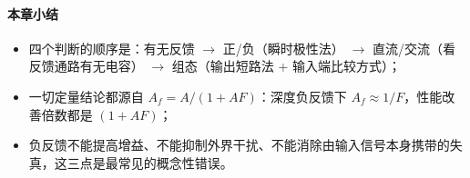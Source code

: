 \paragraph{本章小结}
\begin{itemize}
    \item 四个判断的顺序是：有无反馈 $\to$ 正/负（瞬时极性法） $\to$ 直流/交流（看反馈通路有无电容） $\to$ 组态（输出短路法 + 输入端比较方式）；
    \item 一切定量结论都源自 $A_f=A/(1+AF)$：深度负反馈下 $A_f\approx1/F$，性能改善倍数都是 $(1+AF)$；
    \item 负反馈不能提高增益、不能抑制外界干扰、不能消除由输入信号本身携带的失真，这三点是最常见的概念性错误。
\end{itemize}
